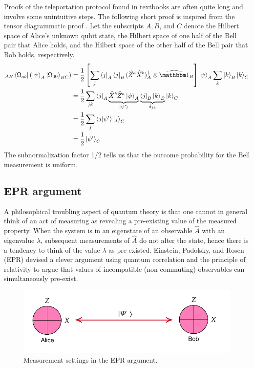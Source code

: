 Proofs of the teleportation protocol found in textbooks are often quite long and involve some unintuitive steps. The following short proof is inspired from the tensor diagrammatic proof \cite{coecke2009}.
Let the subscripts $A,B$, and $C$ denote the Hilbert space of Alice's unknown qubit state, the Hilbert space of one half of the Bell pair that Alice holds, and the Hilbert space of the other half of the Bell pair that Bob holds, respectively.  
	\begin{align}
		{}_{AB}\bra{\Omega_{ab}} \left(\ket{\psi}_A \ket{\Omega_{00}}_{BC}\right)
		&= \frac{1}{2} \left[\sum_j \bra{j}_A \bra{j}_B(\op Z^a \op X^b)_A\dgg \otimes \op \id_B\right] \ket{\psi}_A \sum_k \ket{k}_B \ket{k}_C \\
		&= \frac{1}{2} \sum_{jk} \bra{j}_A\underbrace{\op X^b \op Z^a \ket{\psi}_A}_{\ket{\psi'}} \underbrace{\bra{j}_B\ket{k}_B}_{\delta_{jk}} \ket{k}_C\\
		&= \frac{1}{2} \sum_j \braket{j}{\psi'} \ket{j}_C\\
		&= \frac{1}{2} \ket{\psi'}_C
	\end{align}
	The subnormalization factor 1/2 tells us that the outcome probability for the Bell measurement is uniform.


\subsection{EPR argument}

A philosophical troubling aspect of quantum theory is that one cannot in general think of an act of measuring as revealing a pre-existing value of the measured property. When the system is in an eigenstate of an observable $\hat A$ with an eigenvalue $\lambda$, subsequent measurements of $\hat A$
do not alter the state, hence there is a tendency to think of the value $\lambda$ as pre-existed. Einstein, Padolsky, and Rosen (EPR) devised a clever argument using quantum correlation and the principle of relativity to argue that values of incompatible (non-commuting) observables can simultaneously pre-exist.
\begin{figure}[h]
	\centering
	\includegraphics[scale=0.75]{fig/epr-measurement-setting}
	\caption{Measurement settings in the EPR argument.}
	\label{fig:epr-setting}
\end{figure}

